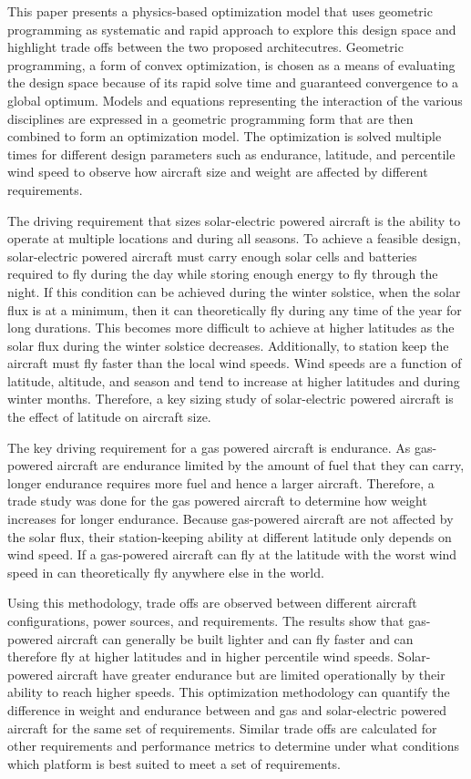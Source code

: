 \documentclass[]{aiaa-tc}%
\begin{document}
This paper presents a physics-based optimization model that uses geometric programming as systematic and rapid approach to explore this design space and highlight trade offs between the two proposed architecutres.
Geometric programming, a form of convex optimization, is chosen as a means of evaluating the design space because of its rapid solve time and guaranteed convergence to a global optimum.\cite{gp}
Models and equations representing the interaction of the various disciplines are expressed in a geometric programming form that are then combined to form an optimization model. 
The optimization is solved multiple times for different design parameters such as endurance, latitude, and percentile wind speed to observe how aircraft size and weight are affected by different requirements. 

The driving requirement that sizes solar-electric powered aircraft is the ability to operate at multiple locations and during all seasons.  
To achieve a feasible design, solar-electric powered aircraft must carry enough solar cells and batteries required to fly during the day while storing enough energy to fly through the night.\cite{solartech}
If this condition can be achieved during the winter solstice, when the solar flux is at a minimum, then it can theoretically fly during any time of the year for long durations. \cite{solartech}
This becomes more difficult to achieve at higher latitudes as the solar flux during the winter solstice decreases.  
Additionally, to station keep the aircraft must fly faster than the local wind speeds.  
Wind speeds are a function of latitude, altitude, and season and tend to increase at higher latitudes and during winter months. 
Therefore, a key sizing study of solar-electric powered aircraft is the effect of latitude on aircraft size.  

The key driving requirement for a gas powered aircraft is endurance.  
As gas-powered aircraft are endurance limited by the amount of fuel that they can carry, longer endurance requires more fuel and hence a larger aircraft.  
Therefore, a trade study was done for the gas powered aircraft to determine how weight increases for longer endurance.
Because gas-powered aircraft are not affected by the solar flux, their station-keeping ability at different latitude only depends on wind speed. 
If a gas-powered aircraft can fly at the latitude with the worst wind speed in can theoretically fly anywhere else in the world.  

Using this methodology, trade offs are observed between different aircraft configurations, power sources, and requirements.  
The results show that gas-powered aircraft can generally be built lighter and can fly faster and can therefore fly at higher latitudes and in higher percentile wind speeds.  
Solar-powered aircraft have greater endurance but are limited operationally by their ability to reach higher speeds.  
This optimization methodology can quantify the difference in weight and endurance between and gas and solar-electric powered aircraft for the same set of requirements. 
Similar trade offs are calculated for other requirements and performance metrics to determine under what conditions which platform is best suited to meet a set of requirements.
\end{document}
